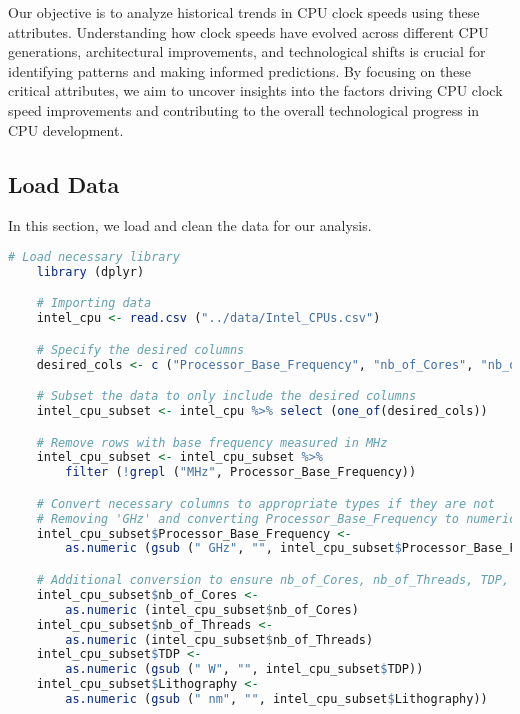 Our objective is to analyze historical trends in CPU clock speeds using these attributes. Understanding how clock speeds have evolved across different CPU generations, architectural improvements, and technological shifts is crucial for identifying patterns and making informed predictions. By focusing on these critical attributes, we aim to uncover insights into the factors driving CPU clock speed improvements and contributing to the overall technological progress in CPU development.

\subsection{Load Data}
In this section, we load and clean the data for our analysis.

\begin{lstlisting}[language=R]
    # Load necessary library
    library (dplyr)

    # Importing data
    intel_cpu <- read.csv ("../data/Intel_CPUs.csv")

    # Specify the desired columns
    desired_cols <- c ("Processor_Base_Frequency", "nb_of_Cores", "nb_of_Threads", "TDP", "Lithography")

    # Subset the data to only include the desired columns
    intel_cpu_subset <- intel_cpu %>% select (one_of(desired_cols))

    # Remove rows with base frequency measured in MHz
    intel_cpu_subset <- intel_cpu_subset %>%
        filter (!grepl ("MHz", Processor_Base_Frequency))

    # Convert necessary columns to appropriate types if they are not
    # Removing 'GHz' and converting Processor_Base_Frequency to numeric
    intel_cpu_subset$Processor_Base_Frequency <- 
        as.numeric (gsub (" GHz", "", intel_cpu_subset$Processor_Base_Frequency))

    # Additional conversion to ensure nb_of_Cores, nb_of_Threads, TDP, and Lithography are numeric where applicable
    intel_cpu_subset$nb_of_Cores <- 
        as.numeric (intel_cpu_subset$nb_of_Cores)
    intel_cpu_subset$nb_of_Threads <- 
        as.numeric (intel_cpu_subset$nb_of_Threads)
    intel_cpu_subset$TDP <- 
        as.numeric (gsub (" W", "", intel_cpu_subset$TDP))
    intel_cpu_subset$Lithography <- 
        as.numeric (gsub (" nm", "", intel_cpu_subset$Lithography))

\end{lstlisting}

\vspace*{1cm}

